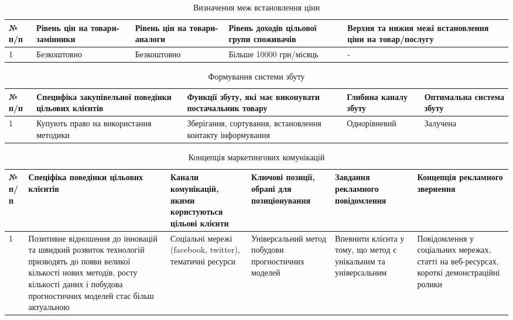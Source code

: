 \begin{table}[h!]
\fontsize{12pt}{12pt}\selectfont
	\begin{tabularx}{\textwidth}{|l|X|X|X|X|}
    \hline
    № п/п & Рівень цін на товари-замінники & Рівень цін на товари-аналоги & Рівень доходів цільової групи споживачів & Верхня та нижня межі встановлення ціни на товар/послугу \\ \hline
    1 & Безкоштовно & Безкоштовно & Більше 10000 грн/місяць & - \\
    \hline
    \end{tabularx}
\caption{Визначення меж встановлення ціни} \label{tab:stab_14}
\end{table}

\begin{table}[h!]
\fontsize{12pt}{12pt}\selectfont
	\begin{tabularx}{\textwidth}{|l|X|X|X|X|}
    \hline
    № п/п & Специфіка закупівельної поведінки цільових клієнтів & Функції збуту, які має виконувати постачальник товару & Глибина каналу збуту & Оптимальна система збуту \\ \hline
    1 & Купують право на використання методики & Зберігання, сортування, встановлення контакту інформування & Однорівневий & Залучена \\
    \hline
    \end{tabularx}
\caption{Формування системи збуту} \label{tab:stab_15}
\end{table}

\begin{table}[h!]
\fontsize{12pt}{12pt}\selectfont
	\begin{tabularx}{\textwidth}{|l|X|X|X|X|X|}
    \hline
    № п/п & Спеціфіка поведінки цільових клієнтів & Канали комунікацій, якими користуються цільові клієнти & Ключові позиції, обрані для позиціонування & Завдання рекламного повідомлення & Концепція рекламного звернення \\ \hline
    1 & Позитивне відношення до інновацій та швидкий розвиток технологій призводять до появи великої кількості нових методів, росту кількості даних і побудова прогностичних моделей стає більш актуальною & Соціальні мережі (facebook, twitter), тематичні ресурси & Універсальний метод побудови прогностичних моделей & Впевнити клієнта у тому, що метод є унікальним та універсальним & Повідомлення у соціальних мережах, статті на веб-ресурсах, короткі демонстраційні ролики \\
    \hline
    \end{tabularx}
\caption{Концепція маркетингових комунікацій} \label{tab:stab_16}
\end{table}

